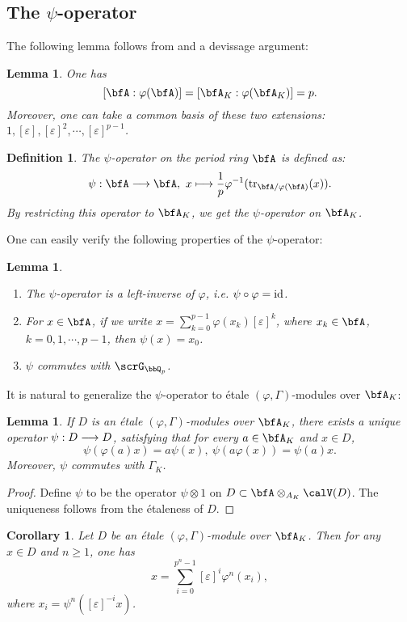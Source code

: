 \documentclass[a4paper,oneside]{amsart}
\newtheorem{lemma}[theorem]{Lemma}
\newtheorem{definition}[theorem]{Definition}
\newtheorem{corollary}[theorem]{Corollary}
\numberwithin{equation}{section}
\numberwithin{figure}{section}
\begin{document}
\subsection{The $\psi$-operator}
The following lemma follows from \cite[Theorem 29.2]{matsumura_commutative_1987} and a devissage argument:
\begin{lemma}
    One has
    $$[\bfA:\varphi(\bfA)]=[\bfA_K:\varphi(\bfA_K)]=p.$$
    Moreover, one can take a common basis of these two extensions:
    $1,[\varepsilon],[\varepsilon]^2,\cdots,[\varepsilon]^{p-1}$.
\end{lemma}
\begin{definition}
    The $\psi$-operator on the period ring $\bfA$ is defined as:
    $$\psi:\bfA\lto\bfA,\ x\longmapsto \frac{1}{p}\varphi^{-1}(\opn{tr}_{\bfA/\varphi(\bfA)}(x)).$$
    By restricting this operator to $\bfA_K$, we get the $\psi$-operator on $\bfA_K$.
\end{definition}
One can easily verify the following properties of the $\psi$-operator:
\begin{lemma}\leavevmode
    \begin{enumerate}
        \item The $\psi$-operator is a left-inverse of $\varphi$, i.e. $\psi\circ\varphi=\operatorname{id}$.
        \item For $x\in\bfA$, if we write $x=\sum_{k=0}^{p-1}\varphi(x_k)[\varepsilon]^k$, where $x_k\in\bfA$, $k=0,1,\cdots,p-1$, then $\psi(x)=x_0$.
        \item $\psi$ commutes with $\scrG_{\bbQ_p}$.
    \end{enumerate}
\end{lemma}

It is natural to generalize the $\psi$-operator to \'etale $(\varphi,\Gamma)$-modules over $\bfA_K$:
\begin{lemma}
    If $D$ is an \'etale $(\varphi,\Gamma)$-modules over $\bfA_K$, there exists a unique operator $\psi:D\longrightarrow D$, satisfying that for every $a\in\bfA_K$ and $x\in D$,
    $$\psi(\varphi(a)x)=a\psi(x),\ \psi(a\varphi(x))=\psi(a)x.$$ Moreover, $\psi$ commutes with $\Gamma_K$.
\end{lemma}
\begin{proof}
    Define $\psi$ to be the operator $\psi\otimes 1$ on $D\subset\bfA\otimes_{A_K}\calV(D)$.  The uniqueness follows from the \'etaleness of $D$.
\end{proof}

\begin{corollary}
    Let $D$ be an \'etale $(\varphi,\Gamma)$-module over $\bfA_K$. Then for any $x\in D$ and $n\geq 1$, one has
    $$x=\sum_{i=0}^{p^n-1}[\varepsilon]^i\varphi^n(x_i),$$
    where $x_i=\psi^n([\varepsilon]^{-i}x)$.
\end{corollary}
\end{document}
